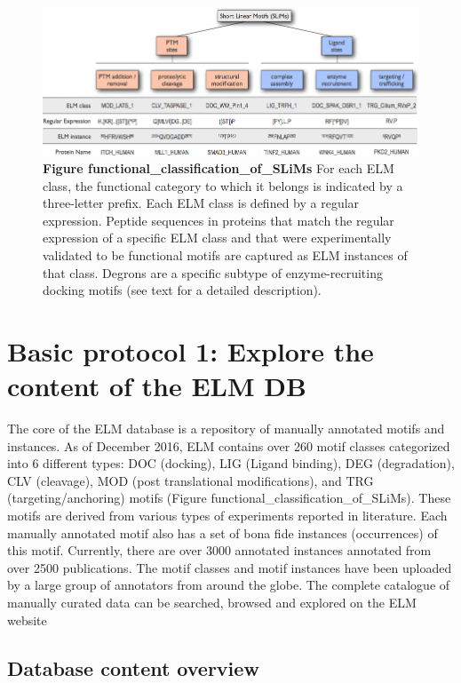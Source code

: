 \begin{figure}[h!]
\centering
\includegraphics[width=\textwidth]{Figures/functional_classification_of_SLiMs.png}
\caption{
\textbf{Figure functional\_classification\_of\_SLiMs}
For each ELM
class, the functional category to which it belongs is indicated by a
three-letter prefix. Each ELM class is defined by a regular expression.
Peptide sequences in proteins that match the regular expression of a
specific ELM class and that were experimentally validated to be
functional motifs are captured as ELM instances of that class. Degrons
are a specific subtype of enzyme-recruiting docking motifs (see text for
a detailed description).
}
\end{figure}

\section{Basic protocol 1: Explore the content of the ELM
DB}\label{basic-protocol-1-explore-the-content-of-the-elm-db}

The core of the ELM database is a repository of manually annotated
motifs and instances. As of December 2016, ELM contains over 260 motif
classes categorized into 6 different types: DOC (docking), LIG (Ligand
binding), DEG (degradation), CLV (cleavage), MOD (post translational
modifications), and TRG (targeting/anchoring) motifs (Figure
functional\_classification\_of\_SLiMs). These motifs are derived from
various types of experiments reported in literature. Each manually
annotated motif also has a set of bona fide instances (occurrences) of
this motif. Currently, there are over 3000 annotated instances annotated
from over 2500 publications. The motif classes and motif instances have
been uploaded by a large group of annotators from around the globe. The
complete catalogue of manually curated data can be searched, browsed and
explored on the ELM website

\subsection{Database content overview}\label{database-content-overview}


